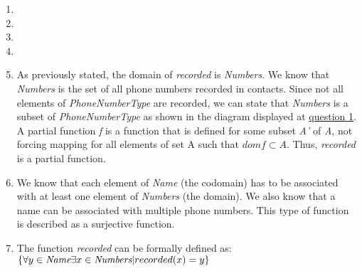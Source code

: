 \begin{enumerate}
    \item
    \item
    \item
    \item
    \item As previously stated, the domain of \emph{recorded} is \emph{Numbers}. We know that \emph{Numbers} is the set 
    of all phone numbers recorded in contacts. Since not all elements of \emph{PhoneNumberType} are recorded, we can
    state that \emph{Numbers} is a subset of \emph{PhoneNumberType} as shown in the diagram displayed at \underline{question 1}.
    A partial function \emph{f} is a function that is defined for some subset \emph{A'} of \emph{A}, not forcing mapping for 
    all elements of set A such that $dom f \subset A$. Thus, \emph{recorded} is a partial function.
    \item We know that each element of \emph{Name} (the codomain) has to be associated with at least one element of 
    \emph{Numbers} (the domain). We also know that a name can be associated with multiple phone numbers. This type of 
    function is described as a surjective function. 
    \item The function \emph{recorded} can be formally defined as:\\
    $\{ \forall y \in \emph{Name}  \exists x \in \emph{Numbers} | recorded(x) = y \}$
\end{enumerate}
